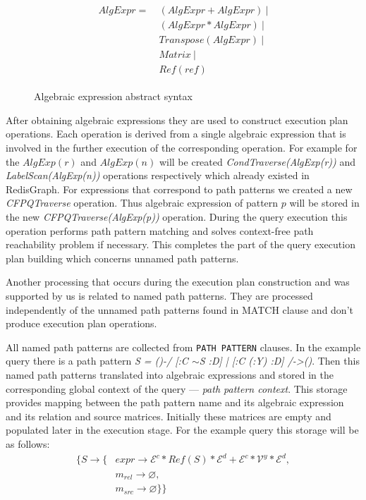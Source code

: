 
\begin{figure}[H]
\caption{Algebraic expression abstract syntax}
\label{fig:alg-expr}
\begin{align*}
\begin{split}
AlgExpr= ~ &(AlgExpr + AlgExpr)~| \\
           &(AlgExpr * AlgExpr)~| \\
           &Transpose(AlgExpr)~| \\
           &Matrix~| \\
           &Ref(ref)        
\end{split}
\end{align*}
\end{figure}

After obtaining algebraic expressions they are used to construct execution plan operations. Each operation is derived from a single algebraic expression that is involved in the further execution of the corresponding operation. For example for the $AlgExp(r)$ and $AlgExp(n)$ will be created \textit{CondTraverse(AlgExp(r))} and \textit{LabelScan(AlgExp(n))} operations respectively which already existed in RedisGraph. For expressions that correspond to path patterns we created a new \textit{CFPQTraverse} operation. Thus algebraic expression of pattern $p$ will be stored in the new \textit{CFPQTraverse(AlgExp(p))} operation. During the query execution this operation performs path pattern matching and solves context-free path reachability problem if necessary. This completes the part of the query execution plan building which concerns unnamed path patterns.

Another processing that occurs during the execution plan construction and was supported by us is related to named path patterns. They are processed independently of the unnamed path patterns found in MATCH clause and don't produce execution plan operations. 

All named path patterns are collected from \lstinline{PATH PATTERN} clauses. In the example query there is a path pattern \textit{S = ()-/ [:C $\sim$S :D] | [:C (:Y) :D] /->()}. Then this named path patterns translated into algebraic expressions and stored in the corresponding global context of the query --- \textit{path pattern context}. This storage provides mapping between the path pattern name and its algebraic expression and its relation and source matrices. Initially these matrices are empty and populated later in the execution stage. For the example query this storage will be as follows:
\begin{align*}
   \{ S  \xrightarrow{} \{ & expr \xrightarrow{} \mathcal{E}^c * Ref(S) * \mathcal{E}^d + \mathcal{E}^c * \mathcal{V}^y * \mathcal{E}^d, \\
                           & m_{rel} \xrightarrow{} \varnothing, \\
                           & m_{src} \xrightarrow{} \varnothing \} \}
\end{align*}

